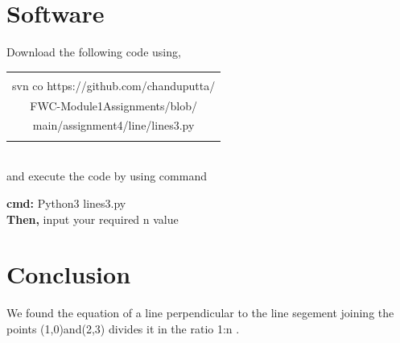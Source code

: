 \documentclass[journal,12pt,twocolumn]{article}
\begin{document}
 
\section{Software}
Download the following code using,
\begin{table}[h]
    \centering
    \begin{tabular}{|c|}
    \hline \\
         svn co https://github.com/chanduputta/ \\FWC-Module1Assignments/blob/\\main/assignment4/line/lines3.py  \\
         \\
\hline
    \end{tabular}
\end{table}
\\
and execute the code by using command
\begin{center}
	\textbf{cmd:}
{Python3  lines3.py}\\
	\textbf{Then,}
{input your required n value}
\end{center}

\section{Conclusion}
\begin{center}
We found the equation of a line perpendicular to the line segement joining the points (1,0)and(2,3) divides it in the ratio 1:n .
\end{center}
\end{document}
